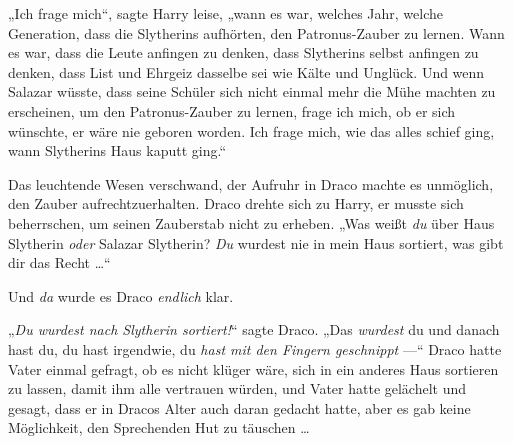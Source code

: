 „Ich frage mich“, sagte Harry leise, „wann es war, welches Jahr, welche Generation, dass die Slytherins aufhörten, den Patronus-Zauber zu lernen. Wann es war, dass die Leute anfingen zu denken, dass Slytherins selbst anfingen zu denken, dass List und Ehrgeiz dasselbe sei wie Kälte und Unglück. Und wenn Salazar wüsste, dass seine Schüler sich nicht einmal mehr die Mühe machten zu erscheinen, um den Patronus-Zauber zu lernen, frage ich mich, ob er sich wünschte, er wäre nie geboren worden. Ich frage mich, wie das alles schief ging, wann Slytherins Haus kaputt ging.“

Das leuchtende Wesen verschwand, der Aufruhr in Draco machte es unmöglich, den Zauber aufrechtzuerhalten. Draco drehte sich zu Harry, er musste sich beherrschen, um seinen Zauberstab nicht zu erheben.
„Was weißt \emph{du} über Haus Slytherin \emph{oder} Salazar Slytherin? \emph{Du} wurdest nie in mein Haus sortiert, was gibt dir das Recht …“

Und \emph{da} wurde es Draco \emph{endlich} klar.

„\emph{Du wurdest nach Slytherin sortiert!}“ sagte Draco.
„Das \emph{wurdest} du und danach hast du, du hast irgendwie, du \emph{hast mit den Fingern geschnippt} —“ Draco hatte Vater einmal gefragt, ob es nicht klüger wäre, sich in ein anderes Haus sortieren zu lassen, damit ihm alle vertrauen würden, und Vater hatte gelächelt und gesagt, dass er in Dracos Alter auch daran gedacht hatte, aber es gab keine Möglichkeit, den Sprechenden Hut zu täuschen …

